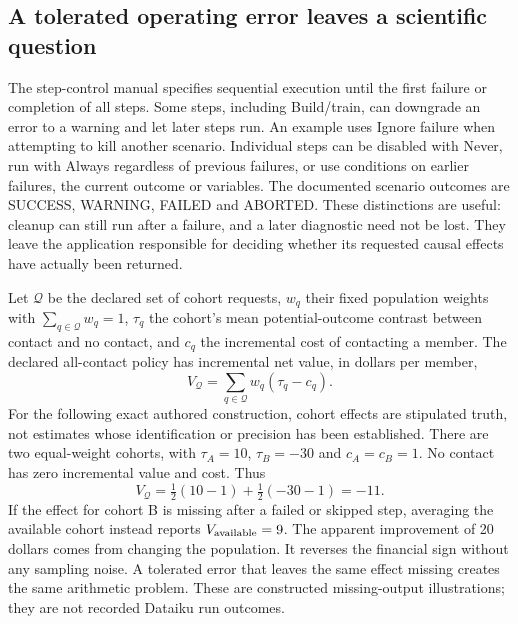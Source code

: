 \subsection{A tolerated operating error leaves a scientific question}

The step-control manual specifies sequential execution until the first failure
or completion of all steps. Some steps, including Build/train, can downgrade
an error to a warning and let later steps run. An example uses Ignore failure
when attempting to kill another scenario. Individual steps can be disabled
with Never, run with Always regardless of previous failures, or use conditions
on earlier failures, the current outcome or variables. The documented scenario
outcomes are SUCCESS, WARNING, FAILED and ABORTED. These distinctions are useful:
cleanup can still run after a failure, and a later diagnostic need not be lost.
They leave the application responsible for deciding whether its requested
causal effects have actually been returned.
\citep{exec23_dss_latest_flow,exec23_dss_dss14_flow}

Let $\mathcal Q$ be the declared set of cohort requests, $w_q$ their fixed
population weights with $\sum_{q\in\mathcal Q}w_q=1$, $\tau_q$ the cohort's
mean potential-outcome contrast between contact and no contact, and $c_q$
the incremental cost of contacting a member. The declared all-contact policy
has incremental net value, in dollars per member,
\begin{equation}
 V_{\mathcal Q}=\sum_{q\in\mathcal Q}w_q(\tau_q-c_q).
 \label{exec23:dss-target}
\end{equation}
For the following exact authored construction, cohort effects are stipulated
truth, not estimates whose identification or precision has been established.
There are two equal-weight cohorts, with $\tau_A=10$, $\tau_B=-30$ and
$c_A=c_B=1$. No contact has zero incremental value and cost. Thus
\begin{equation}
 V_{\mathcal Q}=\tfrac12(10-1)+\tfrac12(-30-1)=-11.
 \label{exec23:dss-full-net}
\end{equation}
If the effect for cohort B is missing after a failed or skipped step, averaging
the available cohort instead reports $V_{\rm available}=9$. The apparent
improvement of 20 dollars comes from changing the population. It reverses the
financial sign without any sampling noise. A tolerated error that leaves the
same effect missing creates the same arithmetic problem. These are constructed
missing-output illustrations; they are not recorded Dataiku run outcomes.
\citep{exec23_dss_denominator_reference}

